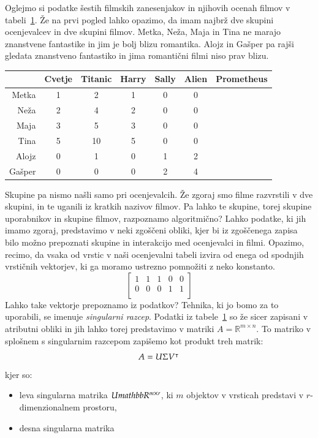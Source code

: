 Oglejmo si podatke šestih filmskih zanesenjakov in njihovih ocenah filmov v tabeli~\ref{t:romance-sf}. Že na prvi pogled lahko opazimo, da imam najbrž dve skupini ocenjevalcev in dve skupini filmov. Metka, Neža, Maja in Tina ne marajo znanstvene fantastike in jim je bolj blizu romantika. Alojz in Gašper pa rajši gledata znanstveno fantastiko in jima romantični filmi niso prav blizu.

\begin{table}
\begin{tabular}{rcccccc}
\toprule
 & Cvetje & Titanic & Harry & Sally & Alien & Prometheus \\
\midrule
Metka & 1 & 2 & 1 & 0 & 0 \\
Neža & 2 & 4 & 2 & 0 & 0 \\
Maja & 3 & 5 & 3 & 0 & 0 \\
Tina & 5 & 10 & 5 & 0 & 0 \\
Alojz & 0 & 1 & 0 & 1 & 2 \\
Gašper & 0 & 0 & 0 & 2 & 4 \\
\bottomrule
\end{tabular}
\label{t:romance-sf}
\end{table}

Skupine pa nismo našli samo pri ocenjevalcih. Že zgoraj smo filme razvrstili v dve skupini, in te uganili iz kratkih nazivov filmov. Pa lahko te skupine, torej skupine uporabnikov in skupine filmov, razpoznamo algoritmično? Lahko podatke, ki jih imamo zgoraj, predstavimo v neki zgoščeni obliki, kjer bi iz zgoščenega zapisa bilo možno prepoznati skupine in interakcijo med ocenjevalci in filmi. Opazimo, recimo, da vsaka od vrstic v naši ocenjevalni tabeli izvira od enega od spodnjih vrstičnih vektorjev, ki ga moramo ustrezno pomnožiti z neko konstanto. 
% 
$$
\begin{bmatrix}
1 & 1 & 1 & 0 & 0 \\
0 & 0 & 0 & 1 & 1 \\
\end{bmatrix}
$$
Lahko take vektorje prepoznamo iz podatkov? Tehnika, ki jo bomo za to uporabili, se imenuje {\em singularni razcep}. Podatki iz tabele~\ref{t:romance-sf} so že sicer zapisani v atributni obliki in jih lahko torej predstavimo v matriki $A=\mathbb{R}^{m\times n}$. To matriko v splošnem s singularnim razcepom zapišemo kot produkt treh matrik:
\begin{equation}
A = U\Sigma V^\intercal
\end{equation}
kjer so:
\begin{itemize}
\item leva singularna matrika $U\\mathbb{R}^{m\times r}$, ki $m$ objektov v vrsticah predstavi v $r$-dimenzionalnem prostoru,
\item desna singularna matrika 
\end{itemize}

\cleardoublepage
